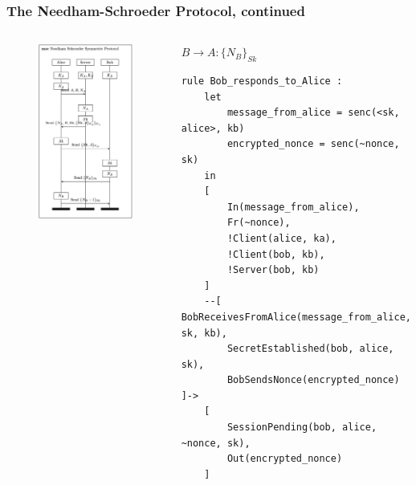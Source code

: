 \documentclass[aspectratio=169,t,xcolor=table]{beamer}
\begin{document}
\begin{frame}[fragile]
    \frametitle{The Needham-Schroeder Protocol, continued}
    \begin{columns}
        \begin{figure}
            \centering
            \includegraphics[width=.8\textwidth]{images/NS.png}
        \end{figure}
        \begin{block}{$B \to A: \{N_B\}_{Sk}$}
            \begin{lstlisting}[language=Tamarin]
rule Bob_responds_to_Alice :
    let
        message_from_alice = senc(<sk, alice>, kb)
        encrypted_nonce = senc(~nonce, sk)
    in
    [
        In(message_from_alice),
        Fr(~nonce),
        !Client(alice, ka),
        !Client(bob, kb),
        !Server(bob, kb)
    ]
    --[ BobReceivesFromAlice(message_from_alice, sk, kb),
        SecretEstablished(bob, alice, sk),
        BobSendsNonce(encrypted_nonce) ]->
    [
        SessionPending(bob, alice, ~nonce, sk),
        Out(encrypted_nonce)
    ]\end{lstlisting}
        \end{block}
    \end{columns}
\end{frame}
\end{document}
